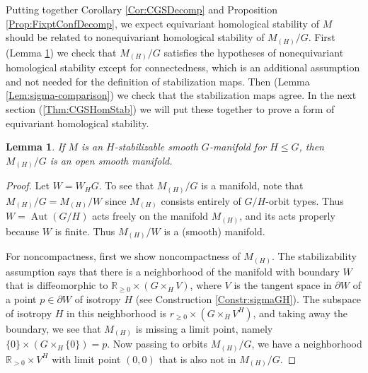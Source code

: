 \documentclass[11pt]{amsart}
\makeatletter
\newtheorem{lemma}[equation]{Lemma}
\theoremstyle{definition}
\numberwithin{equation}{subsection} %
\def\r{\mathbb{R}}
\newcommand{\Aut}{\operatorname{Aut}}
\newcommand{\x}{\times}
\newcommand{\switchmargin}{
\if@reversemargin
\normalmarginpar
\else
\reversemarginpar
\fi
}
\newcommand{\EvaNote}[1]
   {\marginpar{\raggedright\smaller \smaller \color{teal}#1}\switchmargin}
\makeatother
\begin{document}
Putting together Corollary \ref{Cor:CGSDecomp} and Proposition
\ref{Prop:FixptConfDecomp}, we expect equivariant homological stability of $M$ should be
related to nonequivariant homological stability of $M_{(H)}/G$. First (Lemma
\ref{lem:M_(H)/G-open-manifold}) we check that $M_{(H)}/G$ satisfies the
hypotheses of nonequivariant homological stability except for connectedness,
which is an additional assumption and not needed for the definition of
stabilization maps. Then (Lemma
\ref{Lem:sigma-comparison}) we check that the stabilization maps agree. In the
next section (\cref{Thm:CGSHomStab}) we will put these together to prove a form
of equivariant homological stability.

\begin{lemma} \label{lem:M_(H)/G-open-manifold}
If $M$ is an $H$-stabilizable smooth $G$-manifold for $H\leq G$, then
$M_{(H)}/G$ is an open smooth manifold.
\end{lemma}
\begin{proof}
Let $W = W_HG$.
To see that $M_{(H)}/G$ is a manifold, note that $M_{(H)}/G = M_{(H)}/W$ since
$M_{(H)}$ consists entirely of $G/H$-orbit types. Thus $W = \Aut(G/H)$ acts
freely on the manifold $M_{(H)}$, and its acts properly because $W$ is finite. Thus
$M_{(H)}/W$ is a (smooth) manifold.

For noncompactness, first we show noncompactness of $M_{(H)}$. The stabilizability assumption says that there is a
neighborhood of the manifold with boundary $W$ that is diffeomorphic to
$\r_{\geq 0}\x (G\x_H V)$, where $V$ is the tangent space in $\partial W$ of a
point $p\in \partial W$ of isotropy $H$ (see Construction \ref{Constr:sigmaGH}).
The subspace of isotropy $H$ in this neighborhood is $r_{\geq 0}\x (G\x_H V^H)$,
and taking away the boundary, we see that $M_{(H)}$ is missing a limit point,
namely $\{ 0 \}\x (G\x_H \{ 0 \}) = p$. Now passing to orbits $M_{(H)}/G$, we
have a neighborhood $\r_{>0}\x V^H$ with limit point $(0,0)$ that is also not in
$M_{(H)}/G$.
\end{proof}

\end{document}
